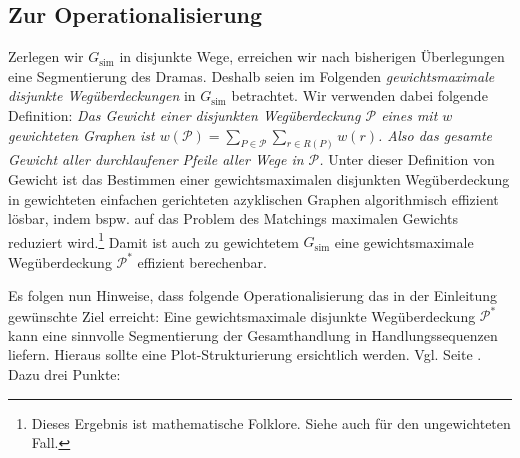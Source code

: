 \documentclass[a4paper,10pt,abstract=true,headings=small]{scrartcl}
\begin{document}
\subsection{Zur Operationalisierung}

Zerlegen wir $G_\text{sim}$ in disjunkte Wege, erreichen wir nach bisherigen Überlegungen eine Segmentierung des Dramas.
Deshalb seien im Folgenden \emph{gewichtsmaximale disjunkte Wegüberdeckungen} in $G_\text{sim}$ betrachtet.
Wir verwenden dabei folgende Definition:
\emph{Das Gewicht einer disjunkten Wegüberdeckung $\mathcal{P}$ eines mit $w$ gewichteten Graphen ist $w(\mathcal{P}) = \sum_{P\in\mathcal{P}} \sum_{r\in R(P)} w(r)$. Also das gesamte Gewicht aller durchlaufener Pfeile aller Wege in $\mathcal{P}$.}
Unter dieser Definition von Gewicht ist das Bestimmen einer gewichtsmaximalen disjunkten Wegüberdeckung in gewichteten einfachen gerichteten azyklischen Graphen algorithmisch effizient lösbar, indem bspw. auf das Problem des Matchings maximalen Gewichts reduziert wird.\footnote{Dieses Ergebnis ist mathematische Folklore. Siehe auch \cite[761]{cormen_introduction_2009} für den ungewichteten Fall.}
Damit ist auch zu gewichtetem $G_\text{sim}$ eine gewichtsmaximale Wegüberdeckung $\mathcal{P}^*$ effizient berechenbar.

Es folgen nun Hinweise, dass folgende Operationalisierung das in der Einleitung gewünschte Ziel erreicht:
Eine gewichtsmaximale disjunkte Wegüberdeckung $\mathcal{P}^*$ kann eine sinnvolle Segmentierung der Gesamthandlung in Handlungssequenzen liefern.
Hieraus sollte eine Plot-Strukturierung ersichtlich werden.
Vgl. Seite \pageref{page:plot-segmentierung}.
Dazu drei Punkte:
\end{document}

